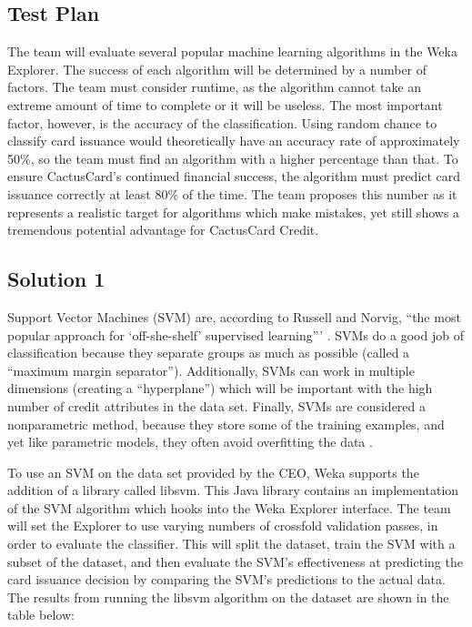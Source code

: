 \documentclass[11pt,journal]{IEEEtran}
\begin{document}
\subsection{Test Plan} \label{testplan}
The team will evaluate several popular machine learning algorithms in the Weka Explorer. The success of each algorithm will be determined by a number of factors. The team must consider runtime, as the algorithm cannot take an extreme amount of time to complete or it will be useless. The most important factor, however, is the accuracy of the classification. Using random chance to classify card issuance would theoretically have an accuracy rate of approximately 50\%, so the team must find an algorithm with a higher percentage than that. To ensure CactusCard's continued financial success, the algorithm must predict card issuance correctly at least 80\% of the time. The team proposes this number as it represents a realistic target for algorithms which make mistakes, yet still shows a tremendous potential advantage for CactusCard Credit.

\subsection{Solution 1}
Support Vector Machines (SVM) are, according to Russell and Norvig, ``the most popular approach for `off-she-shelf' supervised learning''' \cite{ai}. SVMs do a good job of classification because they separate groups as much as possible (called a ``maximum margin separator''). Additionally, SVMs can work in multiple dimensions (creating a ``hyperplane'') which will be important with the high number of credit attributes in the data set. Finally, SVMs are considered a nonparametric method, because they store some of the training examples, and yet like parametric models, they often avoid overfitting the data \cite{ai}.
\par
To use an SVM on the data set provided by the CEO, Weka supports the addition of a library called libsvm. This Java library contains an implementation of the SVM algorithm which hooks into the Weka Explorer interface. The team will set the Explorer to use varying numbers of crossfold validation passes, in order to evaluate the classifier. This will split the dataset, train the SVM with a subset of the dataset, and then evaluate the SVM's effectiveness at predicting the card issuance decision by comparing the SVM's predictions to the actual data. The results from running the libsvm algorithm on the dataset are shown in the table below:
\end{document}
